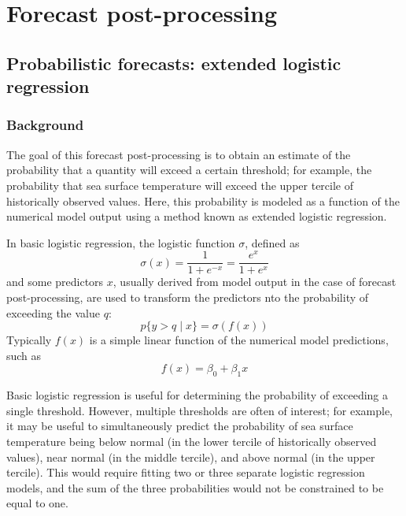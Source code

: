 \documentclass[12pt]{article}
\title{}
\author{}
\date{\today}
\begin{document}
\section{Forecast post-processing}

\subsection{Probabilistic forecasts: extended logistic regression}


\subsubsection{Background}

The goal of this forecast post-processing is to obtain an estimate of the probability that a quantity will exceed a certain
threshold; for example, the probability that sea surface temperature will exceed the upper tercile
of historically observed values. Here, this probability is modeled as a function of the numerical model output
using a method known as extended logistic regression.

In basic logistic regression, the logistic function $\sigma$, defined as
\begin{equation}
\sigma(x) = \frac{1}{1 + e^{-x}} = \frac{e^x}{1 + e^x}
\end{equation}
and some predictors $x$, usually derived from model output in the case of forecast post-processing,
are used to transform the predictors nto the probability of exceeding the value $q$:
\begin{equation}
    p \{ y > q  \mid x \}= \sigma(f(x))
\end{equation}
Typically $f(x)$ is a simple linear function of the numerical model predictions,  
such as
\begin{equation}
    f(x) = \beta_0 + \beta_1 x
\end{equation}

Basic logistic regression is useful for determining the probability of 
exceeding a single threshold. However, multiple thresholds are often of interest; for example,
it may be useful to simultaneously predict the probability of sea surface temperature being below 
normal (in the lower tercile of historically observed values),
near normal (in the middle tercile), and above normal (in the upper tercile).
This would require fitting two or three separate logistic regression models,
and the sum of the three probabilities would not be constrained to be equal to one. 
\end{document}
